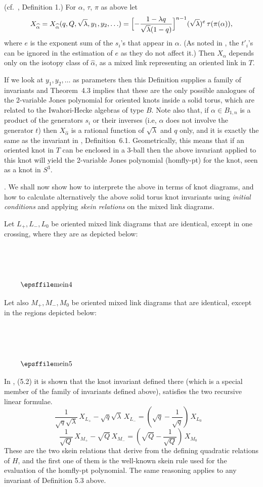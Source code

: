 \begin{defn}{\rm
(cf.\  \cite{L2}, Definition 1.)}  \rm  For $\alpha$, $\tau$, $\pi$ as
above    let  \[X_{\widehat{\alpha}}  =    X_{\widehat{\alpha}}(q,  Q,
\sqrt{\lambda},  y_1, y_2,   \ldots)  =  
\Bigl[-\frac{1-\lambda q}{\sqrt{\lambda}(1-q)} \Bigr]^{n-1}
(\sqrt{\lambda})^e\, \tau(\pi(\alpha)), \] 
where $e$ is the exponent sum of the $s_i$'s that appear
in  $\alpha$.  (As noted in \cite{L2},  the $t'_i$'s can be ignored in
the   estimation   of   $e$    as  they  do  not    affect   it.) Then
$X_{\hat{\alpha}}$   depends    only  on     the   isotopy  class   of
$\widehat{\alpha}$, as a mixed  link representing an oriented  link in
$T$.
\end{defn}
If we look at $y_1,y_2, \ldots$ as parameters then this Definition  supplies
a family of invariants and Theorem~4.3 implies  that these are the only 
possible analogues of the 2-variable Jones polynomial for  oriented knots 
inside a  solid torus, which are related to the Iwahori-Hecke algebras of 
type $B$.  Note also that, if $\alpha \in B_{1,n}$ is a product of  the 
generators $s_i$ or their inverses (i.e, $\alpha$ does not involve the 
generator $t$) then $X_{\hat{\alpha}}$ is a rational function  of 
$\sqrt{\lambda}$ and $q$ only, and  it is exactly the   same as the  
invariant in \cite{Jones}, Definition~6.1. Geometrically, this means  that 
if an oriented knot in $T$ can  be enclosed in a 3-ball then the above 
invariant applied to this knot  will yield the  2-variable Jones polynomial 
(homfly-pt) for the knot, seen as a knot in $S^3$.

.  We shall now show  how to interprete  the above in terms of knot
diagrams,   and how to calculate  alternatively  the above solid torus
knot invariants using {\it initial conditions} and applying {\it skein
relations} on the mixed link diagrams.

Let $L_+ ,   L_-  , L_0$ be   oriented  mixed link diagrams that   are
identical, except in one crossing, where they are as depicted below:

$$\vbox{\picill3inby0.8in(mein4)  }$$

\noindent Let also $M_+ , M_- , M_0$  be oriented mixed link diagrams  
that are identical, except in the regions depicted below:

$$\vbox{\picill3inby0.8in(mein5)  }$$

\noindent In \cite{L2}, (5.2) it is shown that the knot invariant defined 
there (which is a  special member of  the family of invariants defined
above), satisfies the two recursive linear formulae.
\[\frac{1}{\sqrt{q}\sqrt{\lambda}}\,
X_{L_+} - \sqrt{q}\sqrt{\lambda}\,
 X_{L_-}  = (\sqrt{q}-\frac{1}{\sqrt{q}})\,X_{L_0} \ \ \ \  \]
\[\frac{1}{\sqrt{Q}}\, X_{M_+} - {\sqrt{Q}}\, X_{M_-}  =
(\sqrt{Q}-\frac{1}{\sqrt{Q}})\,X_{M_0} \ \ \ \ \]
These are the two skein relations that derive from the defining 
quadratic  relations of    $H$, and  the first   one  of  them is  the
well-known skein rule used   for   the evaluation of   the   homfly-pt
polynomial. The same reasoning applies to any invariant of  Definition 5.3 
above.

